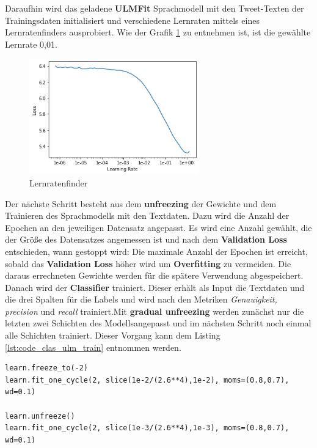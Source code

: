 Daraufhin wird das geladene \textbf{ULMFit} Sprachmodell mit den Tweet-Texten der Trainingsdaten initialisiert und verschiedene Lernraten mittels eines Lernratenfinders ausprobiert. Wie der Grafik \ref{fig:lr_ulmfit} zu entnehmen ist, ist die gew\"ahlte Lernrate 0,01.
\begin{figure}[!ht]
\centering
\includegraphics[height=5cm]{pics/lr_finder_ulmfit.png}
\caption{Lernratenfinder}
\label{fig:lr_ulmfit}
\end{figure}
Der n\"achste Schritt besteht aus dem \textbf{unfreezing} der Gewichte und dem Trainieren des Sprachmodells mit den Textdaten. Dazu wird die Anzahl der Epochen an den jeweiligen Datensatz angepasst. Es wird eine Anzahl gew\"ahlt, die der Gr\"o{\ss}e des Datensatzes angemessen ist und nach dem \textbf{Validation Loss} entschieden, wann gestoppt wird: Die maximale Anzahl der Epochen ist erreicht, sobald das \textbf{Validation Loss} h\"oher wird um \textbf{Overfitting} zu vermeiden. Die daraus errechneten Gewichte werden f\"ur die sp\"atere Verwendung abgespeichert.\\
Danach wird der \textbf{Classifier} trainiert. Dieser erh\"alt als Input die Textdaten und die drei Spalten f\"ur die Labels und wird nach den Metriken \textit{Genauigkeit, precision} und \textit{recall} trainiert.Mit \textbf{gradual unfreezing} werden zun\"achst nur die letzten zwei Schichten des Modellsangepasst und im n\"achsten Schritt noch einmal alle Schichten trainiert. Dieser Vorgang kann dem Listing \ref{lst:code_clas_ulm_train} entnommen werden.
\lstset{language=Python}
\lstset{frame=lines}
\lstset{captionpos=b}
\lstset{basicstyle=\footnotesize}
\begin{lstlisting}
learn.freeze_to(-2)
learn.fit_one_cycle(2, slice(1e-2/(2.6**4),1e-2), moms=(0.8,0.7), wd=0.1)

learn.unfreeze()
learn.fit_one_cycle(2, slice(1e-3/(2.6**4),1e-3), moms=(0.8,0.7), wd=0.1)
\end{lstlisting}

